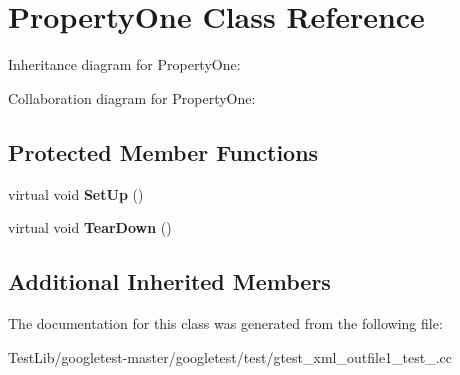 \hypertarget{classPropertyOne}{}\section{Property\+One Class Reference}
\label{classPropertyOne}


Inheritance diagram for Property\+One\+:


Collaboration diagram for Property\+One\+:
\subsection*{Protected Member Functions}
\begin{DoxyCompactItemize}
\item 
\mbox{\label{classPropertyOne_a9cb7d7cb508d5f1a6fc7cfead81ebc2b}} 
virtual void {\bfseries Set\+Up} ()
\item 
\mbox{\label{classPropertyOne_a3ed895113848403d5ea27f52a1bb0545}} 
virtual void {\bfseries Tear\+Down} ()
\end{DoxyCompactItemize}
\subsection*{Additional Inherited Members}


The documentation for this class was generated from the following file\+:\begin{DoxyCompactItemize}
\item 
Test\+Lib/googletest-\/master/googletest/test/gtest\+\_\+xml\+\_\+outfile1\+\_\+test\+\_\+.\+cc\end{DoxyCompactItemize}
